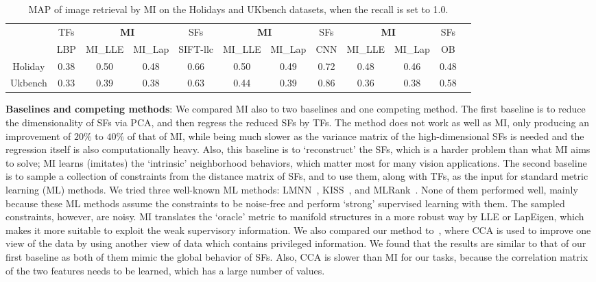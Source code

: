 \documentclass[10pt,twocolumn,letterpaper]{article}
\begin{document}

\begin{table}[!tb]
  \centering \small \setlength{\tabcolsep}{.60em} 
\caption{MAP of image retrieval by MI on the Holidays and UKbench datasets, when the recall is set to 1.0.}
      \begin{tabular}{c|c|ccc|ccc|cccc}
   & TFs & \multicolumn{2}{c}{\textbf{MI}} & SFs & \multicolumn{2}{c}{ \textbf{MI} } & SFs & \multicolumn{2}{c}{ \textbf{MI}} & SFs  \\   
    & LBP & MI\_LLE & MI\_Lap & SIFT-llc  & MI\_LLE & MI\_Lap & CNN &  MI\_LLE & MI\_Lap & OB     \\   \hline  
    Holiday & 0.38  & 0.50  & 0.48  & 0.66   & 0.50  & 0.49  & 0.72  & 0.48  & 0.46  & 0.48 \\
    Ukbench & 0.33  & 0.39  & 0.38  & 0.63   & 0.44  & 0.39  & 0.86  & 0.36  & 0.38  & 0.58\\   
   \end{tabular}
    \label{tab:retrieval} 
\end{table}
 

\textbf{Baselines and competing methods}: We compared MI also to two
baselines and one competing method. The first baseline is to reduce
the dimensionality of SFs via PCA, and then regress the reduced SFs by
TFs. The method does not work as well as MI, only producing
an improvement of $20\%$ to $40\%$ of that of MI, while being much slower
as the variance matrix of the high-dimensional SFs is needed and the
regression itself is also computationally heavy. Also, this baseline is
to `reconstruct' the SFs, which is a harder problem than what MI aims to solve; 
MI learns (imitates) the `intrinsic' neighborhood behaviors, which matter most for many vision applications. The
second baseline is to sample a collection of constraints from the
distance matrix of SFs, and to use them, along with TFs, as the input
for standard metric learning (ML) methods. We tried three well-known
ML methods: LMNN~\cite{max:margin:knn},
KISS~\cite{large:scale:metric:cvpr12}, and
MLRank~\cite{mlrank:10}. None of them performed well, mainly
because these ML methods assume the constraints to be noise-free and
perform `strong' supervised learning with them. The sampled
constraints, however, are noisy. MI translates the `oracle' metric to
manifold structures in a more robust way by LLE or LapEigen, which
makes it more suitable to exploit the weak supervisory information.
We also compared our method to~\cite{IQ:cvpr11}, where CCA
is used to improve one view of the data by using another view of data
which contains privileged information. We found that the results are
similar to that of our first baseline as both of them mimic the global
behavior of SFs. Also, CCA is slower than MI for our tasks, because the correlation
matrix of the two features needs to be learned, which has a large
number of values.
\end{document}
